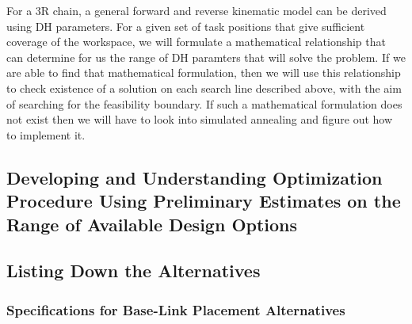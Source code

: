 \documentclass[a4paper,10pt]{article}
\begin{document}
For a 3R chain, a general forward and reverse kinematic model can be derived using DH parameters. For a given set of task positions that give sufficient coverage of the workspace, we will formulate a mathematical relationship that can determine for us the range of DH paramters that will solve the problem. If we are able to find that mathematical formulation, then we will use this relationship to check existence of a solution on each search line described above, with the aim of searching for the feasibility boundary. If such a mathematical formulation does not exist then we will have to look into simulated annealing and figure out how to implement it.


\subsection{Developing and Understanding Optimization Procedure Using Preliminary Estimates on the Range of Available Design Options}

\subsection{Listing Down the Alternatives}

\subsubsection{Specifications for Base-Link Placement Alternatives}
\end{document}
